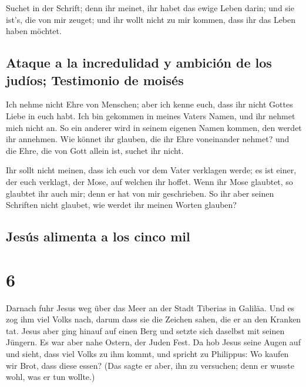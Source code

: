  Suchet in der Schrift; denn ihr meinet, ihr habet das
ewige Leben darin; und sie ist's, die von mir zeuget; 
und ihr wollt nicht zu mir kommen, dass ihr das Leben haben möchtet.

\hypertarget{ataque-a-la-incredulidad-y-ambiciuxf3n-de-los-juduxedos-testimonio-de-moisuxe9s}{%
\subsection{Ataque a la incredulidad y ambición de los judíos;
Testimonio de
moisés}\label{ataque-a-la-incredulidad-y-ambiciuxf3n-de-los-juduxedos-testimonio-de-moisuxe9s}}

 Ich nehme nicht Ehre von Menschen;  aber
ich kenne euch, dass ihr nicht Gottes Liebe in euch habt.
 Ich bin gekommen in meines Vaters Namen, und ihr nehmet
mich nicht an. So ein anderer wird in seinem eigenen Namen kommen, den
werdet ihr annehmen.  Wie könnet ihr glauben, die ihr
Ehre voneinander nehmet? und die Ehre, die von Gott allein ist, suchet
ihr nicht.

 Ihr sollt nicht meinen, dass ich euch vor dem Vater
verklagen werde; es ist einer, der euch verklagt, der Mose, auf welchen
ihr hoffet.  Wenn ihr Mose glaubtet, so glaubtet ihr auch
mir; denn er hat von mir geschrieben.  So ihr aber seinen
Schriften nicht glaubet, wie werdet ihr meinen Worten glauben?

\hypertarget{jesuxfas-alimenta-a-los-cinco-mil}{%
\subsection{Jesús alimenta a los cinco
mil}\label{jesuxfas-alimenta-a-los-cinco-mil}}

\hypertarget{section-5}{%
\section{6}\label{section-5}}

 Darnach fuhr Jesus weg über das Meer an der Stadt
Tiberias in Galiläa.  Und es zog ihm viel Volks nach,
darum dass sie die Zeichen sahen, die er an den Kranken tat.
 Jesus aber ging hinauf auf einen Berg und setzte sich
daselbst mit seinen Jüngern.  Es war aber nahe Ostern, der
Juden Fest.  Da hob Jesus seine Augen auf und sieht, dass
viel Volks zu ihm kommt, und spricht zu Philippus: Wo kaufen wir Brot,
dass diese essen?  (Das sagte er aber, ihn zu versuchen;
denn er wusste wohl, was er tun wollte.)

